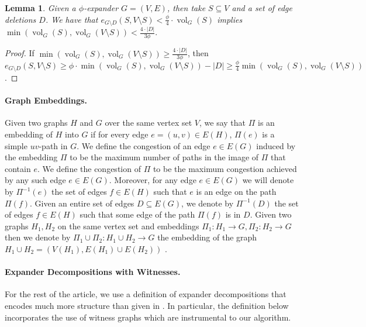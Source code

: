 \documentclass[11pt]{article}
\newtheorem{lemma}[theorem]{Lemma}
\begin{document}
\begin{lemma} \label{lm:helper}
    Given a $\phi$-expander $G=(V,E)$, then take $S \subseteq V$ and a set of edge deletions $D$. We have that $e_{G \setminus {D}}(S, V \setminus S)  < \frac{\phi}{4} \cdot \operatorname{vol}_G(S)$ implies $\min(\operatorname{vol}_G(S), \operatorname{vol}_G(V \setminus S)) < \frac{4\cdot |D|}{3\phi}.$
\end{lemma}
\begin{proof}
    If $\min(\operatorname{vol}_G(S), \operatorname{vol}_G(V \setminus S)) \geq \frac{4 \cdot |D|}{3 \phi}$, then $e_{G \setminus {D}}(S, V \setminus S) \geq \phi \cdot \min(\operatorname{vol}_G(S), \operatorname{vol}_G(V \setminus S)) - |{D}| \geq \frac{\phi}{4} \min(\operatorname{vol}_G(S), \operatorname{vol}_G(V \setminus S))$.
\end{proof}

\paragraph{Graph Embeddings.} Given two graphs $H$ and $G$ over the same vertex set $V$, we say that $\Pi$ is an embedding of $H$ into $G$ if for every edge $e = (u,v) \in E(H)$, $\Pi(e)$ is a simple $uv$-path in $G$. We define the congestion of an edge $e \in E(G)$ induced by the embedding $\Pi$ to be the maximum number of paths in the image of $\Pi$ that contain $e$. We define the congestion of $\Pi$ to be the maximum congestion achieved by any such edge $e \in E(G)$. 
Moreover, for any edge $e \in E(G)$ we will denote by $\Pi^{-1}(e)$ the set of edges $f \in E(H)$ such that $e$ is an edge on the path $\Pi(f)$. Given an entire set of edges $D \subseteq E(G)$, we denote by $\Pi^{-1}(D)$ the set of edges $f \in E(H)$ such that some edge of the path $\Pi(f)$ is in $D$. Given two graphs $H_1, H_2$ on the same vertex set and embeddings $\Pi_1 : H_1 \rightarrow G, \Pi_2 : H_2 \rightarrow G$ then we denote by $\Pi_1 \cup \Pi_2 : H_1 \cup H_2 \rightarrow G$ the embedding of the graph $H_1 \cup H_2 = (V(H_1), E(H_1) \cup E(H_2))$ .

\paragraph{Expander Decompositions with Witnesses.} For the rest of the article, we use a definition of expander decompositions that encodes much more structure than given in . In particular, the definition below incorporates the use of witness graphs which are instrumental to our algorithm. 
\end{document}

